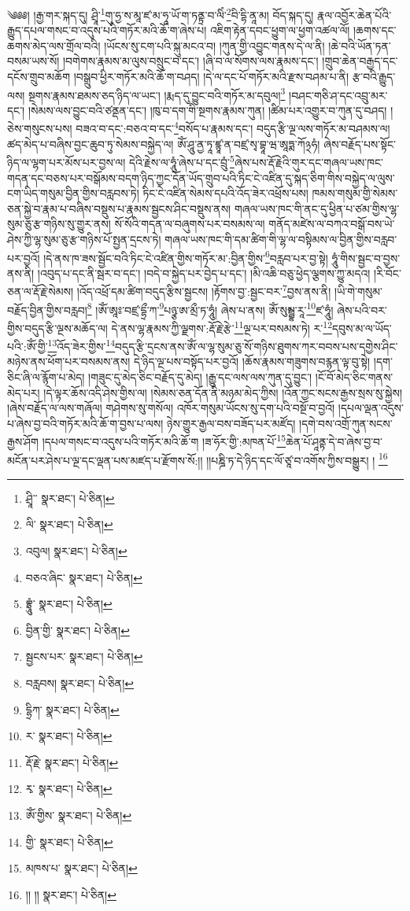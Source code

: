 \setcounter{footnote}{0} 
༄༅༅། །རྒྱ་གར་སྐད་དུ། ཤྲཱི་\footnote{ཤྲཱི་་  སྣར་ཐང་།  པེ་ཅིན། }གུ་ཧྱ་ས་མཱ་ཛ་མ་ཧཱ་ཡོ་ག་ཏནྟྲ་བ་ལིཾ་\footnote{ལི་  སྣར་ཐང་།  པེ་ཅིན། }བི་དྷི་ནཱ་མ། བོད་སྐད་དུ། རྣལ་འབྱོར་ཆེན་པོའི་རྒྱུད་དཔལ་གསང་བ་འདུས་པའི་གཏོར་མའི་ཆོ་ག་ཞེས་པ། འཇིག་རྟེན་དབང་ཕྱུག་ལ་ཕྱག་འཚལ་ལོ། །ཆགས་དང་ཆགས་མེད་ལས་གྲོལ་བའི། །ཡོངས་སུ་ངག་པའི་སྐུ་མངའ་བ། །ཀུན་གྱི་འབྱུང་གནས་དེ་ལ་ནི། །ཆེ་བའི་ཡོན་ཏན་བསམ་ཡས་སོ། །བགེགས་རྣམས་མ་ལུས་བསྲུང་བ་དང་། །ཞི་བ་ལ་སོགས་ལས་རྣམས་དང་། །གྲུབ་ཆེན་བརྒྱད་དང་དངོས་གྲུབ་མཆོག །བསྒྲུབ་ཕྱིར་གཏོར་མའི་ཆོ་ག་བཤད། །དེ་ལ་དང་པོ་གཏོར་མའི་རྫས་བཤམ་པ་ནི། རྩ་བའི་རྒྱུད་ལས། སྔགས་རྣམས་ཐམས་ཅད་ཉིད་ལ་ཡང་། །རྨད་དུ་བྱུང་བའི་གཏོར་མ་དབུལ།\footnote{འབུལ།  སྣར་ཐང་།  པེ་ཅིན། } །བཤང་གཅི་ཤ་དང་འབྲུ་མར་དང་། །སེམས་ལས་བྱུང་བའི་ཙནྡན་དང་། །ཁུ་བ་དག་གི་སྔགས་རྣམས་ཀུན། །ཚིམ་པར་འགྱུར་བ་ཀུན་དུ་བཤད། །ཅེས་གསུངས་པས། བཟའ་བ་དང་:བཅའ་བ་དང་\footnote{བཅའ་ཞིང་  སྣར་ཐང་།  པེ་ཅིན། }བསོད་པ་རྣམས་དང་། བདུད་རྩི་ལྔ་ལས་གཏོར་མ་བཤམས་ལ། ཚད་མེད་པ་བཞིས་བྱང་ཆུབ་ཏུ་སེམས་བསྐྱེད་ལ། ཨོཾ་ཤཱུ་ནྱ་ཏཱ་ཛྙཱ་ན་བཛྲ་སྭ་བྷཱ་ཝ་ཨཱཏྨ་ཀོ྅ཧཾ། ཞེས་བརྗོད་པས་སྟོང་ཉིད་ལ་ལྷག་པར་མོས་པར་བྱས་ལ། དེའི་རྗེས་ལ་ཧཱུཾ་ཞེས་པ་དང་བྲུཾ་\footnote{བྷྲཱུཾ་  སྣར་ཐང་།  པེ་ཅིན། }ཞེས་པས་རྡོ་རྗེའི་གུར་དང་གཞལ་ཡས་ཁང་གདན་དང་བཅས་པར་བསྒོམས་བདག་ཉིད་ཀྱང་དོན་ཡོད་གྲུབ་པའི་ཏིང་ངེ་འཛིན་དུ་སྐད་ཅིག་གིས་བསྐྱེད་ལ་ལུས་ངག་ཡིད་གསུམ་བྱིན་གྱིས་བརླབས་ཏེ། ཏིང་ངེ་འཛིན་སེམས་དཔའི་འོད་ཟེར་འཕྲོས་པས། ཁམས་གསུམ་གྱི་སེམས་ཅན་སྐྱེ་བ་རྣམ་པ་བཞིས་བསྡུས་པ་རྣམས་སྦྱངས་ཤིང་བསྡུས་ནས། གཞལ་ཡས་ཁང་གི་ནང་དུ་ཕྱིན་པ་ཙམ་གྱིས་ལྷ་སུམ་ཅུ་རྩ་གཉིས་སུ་གྱུར་ནས། སོ་སོའི་གདན་ལ་བཞུགས་པར་བསམས་ལ། གནོད་མཛེས་ལ་བཀའ་བསྒོ་བས་ཡེ་ཤེས་ཀྱི་ལྷ་སུམ་ཅུ་རྩ་གཉིས་པོ་སྤྱན་དྲངས་ཏེ། གཞལ་ཡས་ཁང་གི་དམ་ཚིག་གི་ལྷ་ལ་བསྟིམས་ལ་བྱིན་གྱིས་བརླབ་པར་བྱའོ། །དེ་ནས་ཁ་ཟས་སྦྱོང་བའི་ཏིང་ངེ་འཛིན་གྱིས་གཏོར་མ་:བྱིན་གྱིས་\footnote{བྱིན་གྱི་  སྣར་ཐང་།  པེ་ཅིན། }བརླབ་པར་བྱ་སྟེ། ཧཱུཾ་གིས་སྦྱང་བ་བྱས་ནས་ནི། །འབུད་པ་དང་ནི་སྦར་བ་དང་། །བདེ་བ་སྐྱེད་པར་བྱེད་པ་དང་། །མི་འཆི་བཅུ་ཕྱེད་ལྕགས་ཀྱུ་མདའ། །རི་བོང་ཅན་ལ་རྡོ་རྗེ་སེམས། །འོད་འཕྲོ་དམ་ཚིག་བདུད་རྩིས་སྦྱངས། །རྟོགས་བྱ་:སྦྱང་བར་\footnote{སྦྱངས་པར་  སྣར་ཐང་།  པེ་ཅིན། }བྱས་ནས་ནི། །ཡི་གེ་གསུམ་བརྗོད་བྱིན་གྱིས་བརླབ།\footnote{བརླབས།  སྣར་ཐང་།  པེ་ཅིན། } །ཨོཾ་ཨཱཿ་བཛྲ་དྷྲྀ་ཀ་\footnote{དྷྲིཀ་  སྣར་ཐང་།  པེ་ཅིན། }པཉྩ་ཨ་མྲྀ་ཏ་ཧཱུཾ། ཞེས་པ་ནས། ཨོཾ་སུམྦྷ་རཱ་\footnote{ར་  སྣར་ཐང་།  པེ་ཅིན། }ཛ་ཧཱུཾ། ཞེས་པའི་བར་གྱིས་བདུད་རྩི་ལྔས་མཆོད་ལ། དེ་ནས་ལྷ་རྣམས་ཀྱི་ལྗགས་:རྡོ་རྗེ་རྩེ་\footnote{རྡོ་རྗེ་  སྣར་ཐང་།  པེ་ཅིན། }ལྔ་པར་བསམས་ཏེ། ར་\footnote{རྭ་  སྣར་ཐང་།  པེ་ཅིན། }དབུས་མ་ལ་ཡོད་པའི་:ཨོཾ་གྱི་\footnote{ཨོཾ་གྱིས་  སྣར་ཐང་།  པེ་ཅིན། }འོད་ཟེར་གྱིས་\footnote{གྱི་  སྣར་ཐང་།  པེ་ཅིན། }བདུད་རྩི་དྲངས་ནས་ཨོཾ་ལ་ལྷ་སུམ་ཅུ་སོ་གཉིས་ཐུགས་ཀར་བབས་པས་དགྱེས་ཤིང་མཉེས་ནས་ཕོག་པར་བསམས་ནས། དེ་ཉིད་ལྔ་པས་བསྟོད་པར་བྱའོ། །ཆོས་རྣམས་གཟུགས་བརྙན་ལྟ་བུ་སྟེ། །དག་ཅིང་ཞི་ལ་རྙོག་པ་མེད། །གཟུང་དུ་མེད་ཅིང་བརྗོད་དུ་མེད། །རྒྱུ་དང་ལས་ལས་ཀུན་དུ་བྱུང་། །ངོ་བོ་མེད་ཅིང་གནས་མེད་པར། །དེ་ལྟར་ཆོས་འདི་ཤེས་གྱིས་ལ། །སེམས་ཅན་དོན་ནི་མཉམ་མེད་ཀྱིས། །འོན་ཀྱང་སངས་རྒྱས་སྲས་སུ་སྐྱེས། །ཞེས་བརྗོད་ལ་ལས་གཞོལ། གཤེགས་སུ་གསོལ། འཁོར་གསུམ་ཡོངས་སུ་དག་པའི་བསྔོ་བ་བྱའོ། །དཔལ་ལྡན་འདུས་པ་ཞེས་བྱ་བའི་གཏོར་མའི་ཆོ་ག་བྱས་པ་ལས། ཉེས་གྱུར་རྒྱལ་བས་བཟོད་པར་མཛོད། །དགེ་བས་འགྲོ་ཀུན་སངས་རྒྱས་ཤོག །དཔལ་གསང་བ་འདུས་པའི་གཏོར་མའི་ཆོ་ག །ཟ་ཧོར་གྱི་:མཁན་པོ་\footnote{མཁས་པ་  སྣར་ཐང་།  པེ་ཅིན། }ཆེན་པོ་ཤཱནྟ་དེ་བ་ཞེས་བྱ་བ་མངོན་པར་ཤེས་པ་ལྔ་དང་ལྡན་པས་མཛད་པ་རྫོགས་སོ:།། །།པཎྜི་ཏ་དེ་ཉིད་དང་ལོ་ཙཱ་བ་འགོས་ཀྱིས་བསྒྱུར། ། \footnote{།། །།   སྣར་ཐང་།  པེ་ཅིན། }